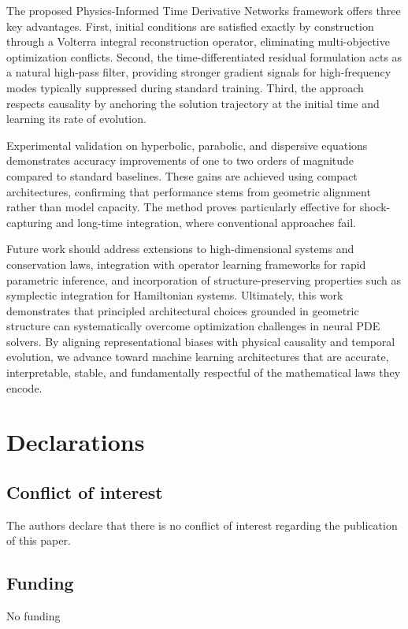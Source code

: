 \documentclass[11pt,reqno]{amsart}
\theoremstyle{plain}
\theoremstyle{definition}
\theoremstyle{remark}
\begin{document}
The proposed Physics-Informed Time Derivative Networks framework offers three key advantages. First, initial conditions are satisfied exactly by construction through a Volterra integral reconstruction operator, eliminating multi-objective optimization conflicts. Second, the time-differentiated residual formulation acts as a natural high-pass filter, providing stronger gradient signals for high-frequency modes typically suppressed during standard training. Third, the approach respects causality by anchoring the solution trajectory at the initial time and learning its rate of evolution.

Experimental validation on hyperbolic, parabolic, and dispersive equations demonstrates accuracy improvements of one to two orders of magnitude compared to standard baselines. These gains are achieved using compact architectures, confirming that performance stems from geometric alignment rather than model capacity. The method proves particularly effective for shock-capturing and long-time integration, where conventional approaches fail.

Future work should address extensions to high-dimensional systems and conservation laws, integration with operator learning frameworks for rapid parametric inference, and incorporation of structure-preserving properties such as symplectic integration for Hamiltonian systems. Ultimately, this work demonstrates that principled architectural choices grounded in geometric structure can systematically overcome optimization challenges in neural PDE solvers. By aligning representational biases with physical causality and temporal evolution, we advance toward machine learning architectures that are accurate, interpretable, stable, and fundamentally respectful of the mathematical laws they encode.

\section*{Declarations}

\subsection*{Conflict of interest}
The authors declare that there is no conflict of interest regarding the publication of this paper.

\subsection*{Funding}
No funding
\end{document}
